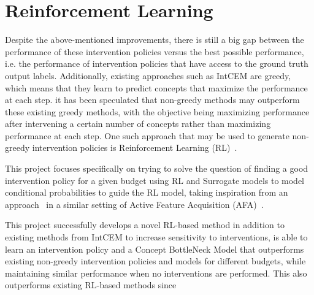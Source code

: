 \documentclass[../main.tex]{subfiles}
\begin{document}
\section{Reinforcement Learning}
Despite the above-mentioned improvements, there is still a big gap between the
performance
of these intervention policies versus the best possible performance, i.e. the performance of 
intervention policies that have access to the ground truth output labels.
Additionally, existing approaches such as IntCEM are greedy, which means that
they learn to predict concepts that maximize the performance at each step.
it has been speculated that non-greedy methods may outperform 
these existing greedy methods, with the objective being maximizing 
performance after intervening a certain number of concepts rather than maximizing 
performance at each step. 
One such approach that may be used to generate non-greedy intervention policies 
is Reinforcement Learning (RL)~\cite{rl}.

This project focuses specifically on trying to solve the 
question of finding a good intervention policy for a given 
budget using RL and Surrogate models to model conditional 
probabilities to guide the RL model, taking inspiration
from an approach~\cite{gsmrl} in a similar setting of
Active Feature Acquisition (AFA)~\cite{afa}.

This project successfully develops a novel RL-based method
in addition to 
existing methods from IntCEM to increase sensitivity
to interventions, is able to learn an intervention policy
and a Concept BottleNeck Model that outperforms
existing 
non-greedy intervention policies and models
for different budgets, while maintaining similar performance
when no interventions are performed. This also outperforms existing RL-based methods since 
\end{document}
